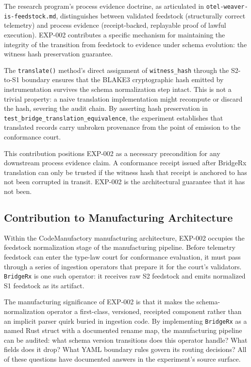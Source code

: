 The research program's process evidence doctrine, as articulated in
\texttt{otel-weaver-is-feedstock.md}, distinguishes between validated feedstock
(structurally correct telemetry) and process evidence (receipt-backed, replayable
proof of lawful execution). EXP-002 contributes a specific mechanism for maintaining
the integrity of the transition from feedstock to evidence under schema evolution:
the witness hash preservation guarantee.

The \texttt{translate()} method's direct assignment of \texttt{witness\_hash} through
the S2-to-S1 boundary ensures that the BLAKE3 cryptographic hash emitted by
instrumentation survives the schema normalization step intact. This is not a trivial
property: a naive translation implementation might recompute or discard the hash,
severing the audit chain. By asserting hash preservation in
\texttt{test\_bridge\_translation\_equivalence}, the experiment establishes that
translated records carry unbroken provenance from the point of emission to the
conformance court.

This contribution positions EXP-002 as a necessary precondition for any downstream
process evidence claim. A conformance receipt issued after BridgeRx translation can
only be trusted if the witness hash that receipt is anchored to has not been
corrupted in transit. EXP-002 is the architectural guarantee that it has not been.

\subsection{Contribution to Manufacturing Architecture}
\label{sec:otel-weaver-exp-002-diff-to-residual-contribution-manufacturing}

Within the CodeManufactory manufacturing architecture, EXP-002 occupies the feedstock
normalization stage of the manufacturing pipeline. Before telemetry feedstock can
enter the type-law court for conformance evaluation, it must pass through a series
of ingestion operators that prepare it for the court's validators. \texttt{BridgeRx}
is one such operator: it receives raw S2 feedstock and emits normalized S1 feedstock
as its artifact.

The manufacturing significance of EXP-002 is that it makes the schema-normalization
operator a first-class, versioned, receipted component rather than an implicit
parser quirk buried in ingestion code. By implementing \texttt{BridgeRx} as a named
Rust struct with a documented rename map, the manufacturing pipeline can be audited:
what schema version transitions does this operator handle? What fields does it drop?
What YAML boundary rules govern its routing decisions? All of these questions have
documented answers in the experiment's source surface.

